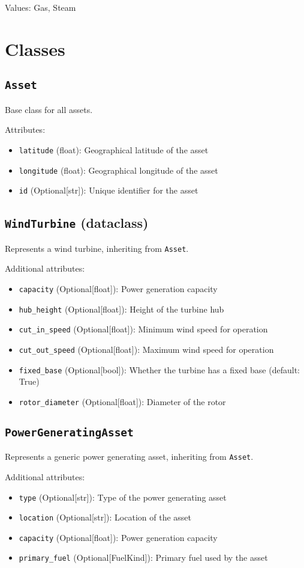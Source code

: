\documentclass{article}
\begin{document}
Values: Gas, Steam

\section{Classes}

\subsection{\texttt{Asset}}
Base class for all assets.

Attributes:
\begin{itemize}
    \item \texttt{latitude} (float): Geographical latitude of the asset
    \item \texttt{longitude} (float): Geographical longitude of the asset
    \item \texttt{id} (Optional[str]): Unique identifier for the asset
\end{itemize}

\subsection{\texttt{WindTurbine} (dataclass)}
Represents a wind turbine, inheriting from \texttt{Asset}.

Additional attributes:
\begin{itemize}
    \item \texttt{capacity} (Optional[float]): Power generation capacity
    \item \texttt{hub\_height} (Optional[float]): Height of the turbine hub
    \item \texttt{cut\_in\_speed} (Optional[float]): Minimum wind speed for operation
    \item \texttt{cut\_out\_speed} (Optional[float]): Maximum wind speed for operation
    \item \texttt{fixed\_base} (Optional[bool]): Whether the turbine has a fixed base (default: True)
    \item \texttt{rotor\_diameter} (Optional[float]): Diameter of the rotor
\end{itemize}

\subsection{\texttt{PowerGeneratingAsset}}
Represents a generic power generating asset, inheriting from \texttt{Asset}.

Additional attributes:
\begin{itemize}
    \item \texttt{type} (Optional[str]): Type of the power generating asset
    \item \texttt{location} (Optional[str]): Location of the asset
    \item \texttt{capacity} (Optional[float]): Power generation capacity
    \item \texttt{primary\_fuel} (Optional[FuelKind]): Primary fuel used by the asset
\end{itemize}
\end{document}
